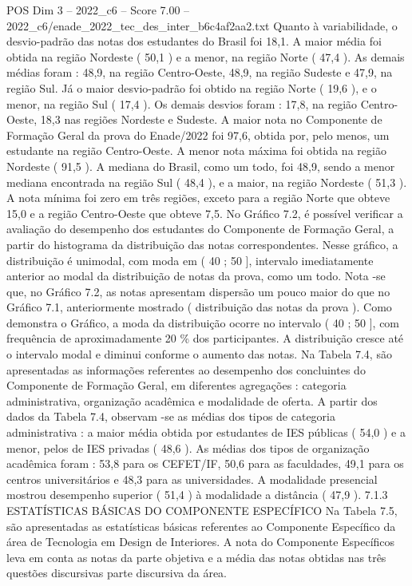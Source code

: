 \begin{textsample}{POS Dim 3 – 2022\_c6 – Score 7.00 – 2022\_c6/enade\_2022\_tec\_des\_inter\_b6c4af2aa2.txt}
Quanto à variabilidade, o desvio-padrão das notas dos estudantes do Brasil foi 18,1.
A maior média foi obtida na região Nordeste ( 50,1 ) e a menor, na região Norte ( 47,4 ).
As demais médias foram : 48,9, na região Centro-Oeste, 48,9, na região Sudeste e 47,9, na região Sul.
Já o maior desvio-padrão foi obtido na região Norte ( 19,6 ), e o menor, na região Sul ( 17,4 ).
Os demais desvios foram : 17,8, na região Centro-Oeste, 18,3 nas regiões Nordeste e Sudeste.
A maior nota no Componente de Formação Geral da prova do Enade/2022 foi 97,6, obtida por, pelo menos, um estudante na região Centro-Oeste.
A menor nota máxima foi obtida na região Nordeste ( 91,5 ).
A mediana do Brasil, como um todo, foi 48,9, sendo a menor mediana encontrada na região Sul ( 48,4 ), e a maior, na região Nordeste ( 51,3 ).
A nota mínima foi zero em três regiões, exceto para a região Norte que obteve 15,0 e a região Centro-Oeste que obteve 7,5.
No Gráfico 7.2, é possível verificar a avaliação do desempenho dos estudantes do Componente de Formação Geral, a partir do histograma da distribuição das notas correspondentes.
Nesse gráfico, a distribuição é unimodal, com moda em ( 40 ; 50 ], intervalo imediatamente anterior ao modal da distribuição de notas da prova, como um todo.
Nota -se que, no Gráfico 7.2, as notas apresentam dispersão um pouco maior do que no Gráfico 7.1, anteriormente mostrado ( distribuição das notas da prova ).
Como demonstra o Gráfico, a moda da distribuição ocorre no intervalo ( 40 ; 50 ], com frequência de aproximadamente 20 \% dos participantes.
A distribuição cresce até o intervalo modal e diminui conforme o aumento das notas.
Na Tabela 7.4, são apresentadas as informações referentes ao desempenho dos concluintes do Componente de Formação Geral, em diferentes agregações : categoria administrativa, organização acadêmica e modalidade de oferta.
A partir dos dados da Tabela 7.4, observam -se as médias dos tipos de categoria administrativa : a maior média obtida por estudantes de IES públicas ( 54,0 ) e a menor, pelos de IES privadas ( 48,6 ).
As médias dos tipos de organização acadêmica foram : 53,8 para os CEFET/IF, 50,6 para as faculdades, 49,1 para os centros universitários e 48,3 para as universidades.
A modalidade presencial mostrou desempenho superior ( 51,4 ) à modalidade a distância ( 47,9 ). 7.1.3 ESTATÍSTICAS BÁSICAS DO COMPONENTE ESPECÍFICO Na Tabela 7.5, são apresentadas as estatísticas básicas referentes ao Componente Específico da área de Tecnologia em Design de Interiores.
A nota do Componente Específicos leva em conta as notas da parte objetiva e a média das notas obtidas nas três questões discursivas parte discursiva da área.

\end{textsample}
